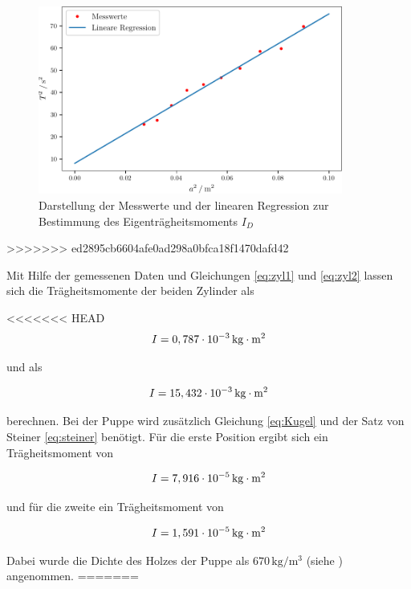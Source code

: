 \begin{figure}
    \centering
    \includegraphics[width=10cm]{build/plot.pdf}
    \caption{Darstellung der Messwerte und der linearen Regression zur Bestimmung des Eigenträgheitsmoments $I_D$}
\end{figure}
>>>>>>> ed2895cb6604afe0ad298a0bfca18f1470dafd42

Mit Hilfe der gemessenen Daten und Gleichungen \ref{eq:zyl1} und \ref{eq:zyl2}
lassen sich die Trägheitsmomente der beiden Zylinder
als

<<<<<<< HEAD
\begin{equation*}
  I=0,787 \cdot 10^{-3}\,\si[inter-unit-product=\cdot]{\kilo\gram\meter\squared}
\end{equation*}

\noindent und als

\begin{equation*}
  I=15,432 \cdot 10^{-3}\,\si[inter-unit-product=\cdot]{\kilo\gram\meter\squared}
\end{equation*}

\noindent berechnen. Bei der Puppe wird zusätzlich 
Gleichung \ref{eq:Kugel} und der Satz von Steiner \ref{eq:steiner}
benötigt. Für die erste Position ergibt sich ein
Trägheitsmoment von

\begin{equation*}
  I=7,916 \cdot 10^{-5}\,\si[inter-unit-product=\cdot]{\kilo\gram\meter\squared}
\end{equation*}

\noindent und für die zweite ein Trägheitsmoment von

\begin{equation*}
  I=1,591 \cdot 10^{-5}\,\si[inter-unit-product=\cdot]{\kilo\gram\meter\squared}
\end{equation*}

\noindent Dabei wurde die Dichte des Holzes der Puppe
als $670\,\si{\kilo\gram \per \cubic \meter}$ (siehe \cite{holz})
angenommen.
=======


